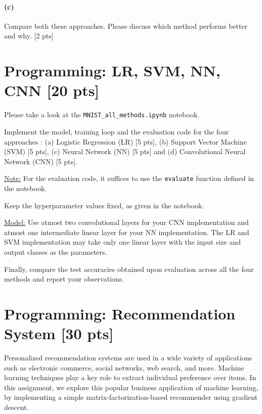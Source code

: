 \documentclass[twoside,10pt]{article}
\begin{document}
\paragraph{(c)} Compare both these approaches. Please discuss which method performs better and why. [2 pts]

\vspace{1cm}


\section{Programming: LR, SVM, NN, CNN [20 pts]}

Please take a look at the \texttt{MNIST\_all\_methods.ipynb} notebook.

Implement the model, training loop and the evaluation code for the four approaches : (a) Logistic Regression (LR) [5 pts], (b) Support Vector Machine (SVM) [5 pts], (c) Neural Network (NN) [5 pts] and (d) Convolutional Neural Network (CNN) [5 pts].


\underline{Note:} For the evaluation code, it suffices to use the \texttt{evaluate} function defined in the notebook. 

Keep the hyperparameter values fixed, as given in the notebook. 

\underline{Model:} Use atmost two convolutional layers for your CNN implementation and atmost one intermediate linear layer for your NN implementation. The LR and SVM implementation may take only one linear layer with the input size and output classes as the parameters. 


Finally, compare the test accuracies obtained upon evaluation across all the four methods and report your observations. 


\section{Programming: Recommendation System [30 pts]}

Personalized recommendation systems are used in a wide variety of
applications such as electronic commerce, social networks, web
search, and more. Machine learning techniques play a key role to
extract individual preference over items. In this assignment, we
explore this popular business application of machine learning, by
implementing a simple matrix-factorization-based recommender using
gradient descent.
\end{document}

